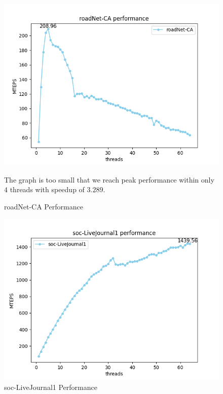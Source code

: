 \documentclass[10pt,twocolumn,letterpaper]{article}
\begin{document}
\begin{figure}[h]
    \centering
    \includegraphics[scale=0.5]{figures/roadNet-CA.png}
    \caption{roadNet-CA Performance}
    \label{fig:roadNet-CA}
    The graph is too small that we reach peak performance within only $4$ threads with speedup of $3.289$.
\end{figure}

\begin{figure}[h]
    \centering
    \includegraphics[scale=0.5]{figures/soc-LiveJournal1.png}
    \caption{soc-LiveJournal1 Performance}
    \label{fig:soc-LiveJournal1}
\end{figure}
\end{document}
